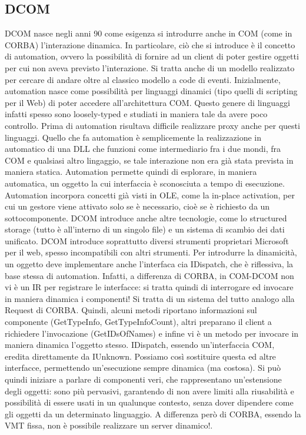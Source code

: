 \subsection{DCOM}
DCOM nasce negli anni 90 come esigenza si introdurre anche in COM (come in CORBA) l'interazione dinamica. In
particolare, ciò che si introduce è il concetto di automation, ovvero la possibilità di fornire ad un client di poter
gestire oggetti per cui non aveva previsto l'interazione. Si tratta anche di un modello realizzato per cercare di andare
oltre al classico modello a code di eventi.
Inizialmente, automation nasce come possibilità per linguaggi dinamici (tipo quelli di scripting per il Web) di poter
accedere all'architettura COM. Questo genere di linguaggi infatti spesso sono loosely-typed e studiati in maniera tale
da avere poco controllo. Prima di automation risultava difficile realizzare proxy anche per questi linguaggi.
Quello che fa automation è semplicemente la realizzazione in automatico di una DLL che funzioni come intermediario fra i
due mondi, fra COM e qualsiasi altro lingaggio, se tale interazione non era già stata prevista in maniera statica.
Automation permette quindi di esplorare, in maniera automatica, un oggetto la cui interfaccia è sconosciuta a tempo di
esecuzione. Automation incorpora concetti già visti in OLE, come la in-place activation, per cui un gestore viene
attivato solo se è necessario, cioè se è richiesto da un sottocomponente. DCOM introduce anche altre tecnologie, come lo
structured storage (tutto è all'interno di un singolo file) e un sistema di scambio dei dati unificato. DCOM introduce
soprattutto diversi strumenti proprietari Microsoft per il web, spesso incompatibili con altri strumenti.
Per introdurre la dinamicità, un oggetto deve implementare anche l'interfaca cia IDispatch, che è riflessiva, la base
stessa di automation. Infatti, a differenza di CORBA, in COM-DCOM non vi è un IR per registrare le interfacce: si tratta
quindi di interrogare ed invocare in maniera dinamica i componenti! Si tratta di un sistema del tutto analogo alla
Request di CORBA.
Quindi, alcuni metodi riportano informazioni sul componente (GetTypeInfo, GetTypeInfoCount), altri preparano il client a
richiedere l'invocazione (GetIDsOfNames) e infine vi è un metodo per invocare in maniera dinamica l'oggetto stesso.
IDispatch, essendo un'interfaccia COM, eredita direttamente da IUnknown. Possiamo così sostituire questa ed altre
interfacce, permettendo un'esecuzione sempre dinamica (ma costosa).
Si può quindi iniziare a parlare di componenti veri, che rappresentano un'estensione degli oggetti: sono più pervasivi,
garantendo di non avere limiti alla riusabilità e possibilità di essere usati in un qualunque contesto, senza dover
dipendere come gli oggetti da un determinato linguaggio.
A differenza però di CORBA, essendo la VMT fissa, non è possibile realizzare un server dinamico!.
